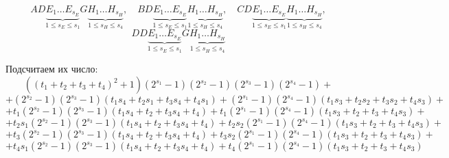 \documentclass[12pt,a4paper,oneside,fleqn,leqno]{article}
\theoremstyle{definition}
\begin{document}
		$$
			AD\underbrace{E_1\ldots E_{s_E}}_{1\leqslant s_E \leqslant s_1}G\underbrace{H_1\ldots H_{s_H}}_{1\leqslant s_H \leqslant s_4},\quad BD\underbrace{E_1\ldots E_{s_E}}_{1\leqslant s_E \leqslant s_1}\underbrace{H_1\ldots H_{s_H}}_{1\leqslant s_H \leqslant s_4},\quad CD\underbrace{E_1\ldots E_{s_E}}_{1\leqslant s_E \leqslant s_1}\underbrace{H_1\ldots H_{s_H}}_{1\leqslant s_H \leqslant s_4}, $$ $$DD\underbrace{E_1\ldots E_{s_E}}_{1\leqslant s_E \leqslant s_1}G\underbrace{H_1\ldots H_{s_H}}_{1\leqslant s_H \leqslant s_4}
		$$\par
		Подсчитаем их число:
		$$
			((t_1 + t_2 + t_3 + t_4)^2 + 1)(2^{s_1} - 1)(2^{s_2} - 1)(2^{s_3} - 1)(2^{s_4} - 1) + 
		$$
		$$
			+ (2^{s_2} - 1)(2^{s_3} - 1) \left (t_1s_4 + t_2s_1 + t_3s_4 + t_4s_1 \right)+ 
			(2^{s_1} - 1)(2^{s_4} - 1)\left (t_1s_3 + t_2s_2 + t_3s_2 + t_4s_3\right) + 
		$$
		$$
			+ t_1(2^{s_2} - 1)(2^{s_3} - 1) \left (t_1s_4 + t_2 + t_3s_4 + t_4\right)+ 
			t_1(2^{s_1} - 1)(2^{s_4} - 1) \left (t_1s_3 + t_2 + t_3 + t_4s_3\right)+ 
		$$
		$$
			+ t_2s_1(2^{s_2} - 1)(2^{s_3} - 1) \left (t_1s_4 + t_2 + t_3s_4 + t_4\right)+ 
			t_2s_2(2^{s_1} - 1)(2^{s_4} - 1) \left (t_1s_3 + t_2 + t_3 + t_4s_3\right)+ 
		$$
		$$
			+ t_3(2^{s_2} - 1)(2^{s_3} - 1) \left (t_1s_4 + t_2 + t_3s_4 + t_4\right)+ 
			t_3s_2(2^{s_1} - 1)(2^{s_4} - 1) \left (t_1s_3 + t_2 + t_3 + t_4s_3\right)+ 
		$$
		$$
			+ t_4s_1(2^{s_2} - 1)(2^{s_3} - 1) \left (t_1s_4 + t_2 + t_3s_4 + t_4\right)+ 
			t_4(2^{s_1} - 1)(2^{s_4} - 1) \left (t_1s_3 + t_2 + t_3 + t_4s_3\right)
		$$
\end{document}
